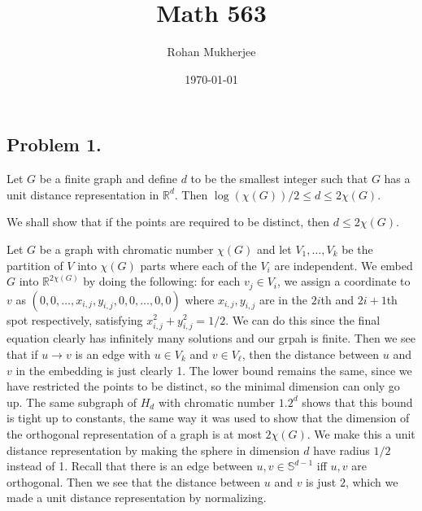 \documentclass[12pt]{article}
\title{Math 563}
\date{\today}
\author{Rohan Mukherjee}
\newenvironment{theorem}{\begin{mytheorem}}{\end{mytheorem}}
\theoremstyle{definitionstyle}
\def\mbb#1{\mathbb{#1}}
\def\R{\mbb{R}}
\renewcommand{\S}{\mbb S}
\begin{document}
    \maketitle
    \subsection*{Problem 1.}
    \begin{theorem}
        Let $G$ be a finite graph and define $d$ to be the smallest integer such that $G$ has a unit distance representation in $\R^d$. Then $\log(\chi(G))/2 \leq d \leq 2\chi(G)$. 
    \end{theorem}
    We shall show that if the points are required to be distinct, then $d \leq 2\chi(G)$. 
    
    Let $G$ be a graph with chromatic number $\chi(G)$ and let $V_1, \ldots, V_k$ be the partition of $V$ into $\chi(G)$ parts where each of the $V_i$ are independent. We embed $G$ into $\R^{2\chi(G)}$ by doing the following: for each $v_j \in V_i$, we assign a coordinate to $v$ as $(0, 0, \ldots, x_{i,j}, y_{i,j}, 0, 0, \ldots, 0, 0)$ where $x_{i,j}, y_{i,j}$ are in the $2i$th and $2i+1$th spot respectively, satisfying $x_{i,j}^2 + y_{i,j}^2 = 1/2$. We can do this since the final equation clearly has infinitely many solutions and our grpah is finite. Then we see that if $u \to v$ is an edge with $u \in V_k$ and $v \in V_\ell$, then the distance between $u$ and $v$ in the embedding is just clearly 1. The lower bound remains the same, since we have restricted the points to be distinct, so the minimal dimension can only go up. The same subgraph of $H_d$ with chromatic number $1.2^d$ shows that this bound is tight up to constants, the same way it was used to show that the dimension of the orthogonal representation of a graph is at most $2\chi(G)$. We make this a unit distance representation by making the sphere in dimension $d$ have radius $1/2$ instead of 1. Recall that there is an edge between $u, v \in \S^{d-1}$ iff $u,v$ are orthogonal. Then we see that the distance between $u$ and $v$ is just $2$, which we made a unit distance representation by normalizing.
    
\end{document}
